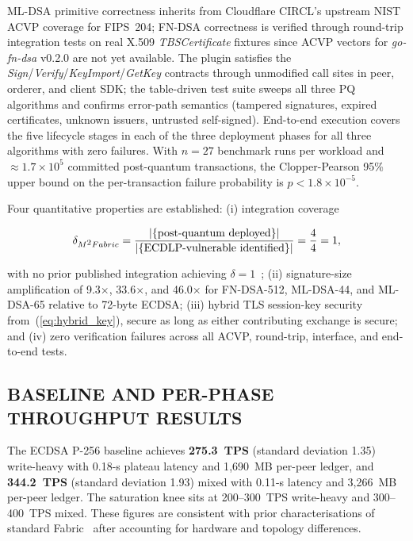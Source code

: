 \documentclass{ieeetj}
\makeatletter
\newcommand{\mfabric}{M\textsuperscript{2}Fabric}
\def\subsubsectionfont{\fontfamily{\sfdefault}\fontsize{9}{12}\selectfont\bfseries\raggedright}
\def\subsubsection{\@startsection{subsubsection}{3}{\z@}{-8pt \@plus -2pt \@minus -2pt}{1pt}{\subsubsectionfont}}
\makeatother
\begin{document}
ML-DSA primitive correctness inherits from Cloudflare CIRCL's upstream
NIST ACVP coverage for FIPS~204; FN-DSA correctness is verified through
round-trip integration tests on real X.509 \textit{TBSCertificate}
fixtures since ACVP vectors for \textit{go-fn-dsa} v0.2.0 are not yet
available. The plugin satisfies the
\textit{Sign}/\textit{Verify}/\textit{KeyImport}/\textit{GetKey} contracts
through unmodified call sites in peer, orderer, and client SDK; the
table-driven test suite sweeps all three PQ algorithms and confirms
error-path semantics (tampered signatures, expired certificates, unknown
issuers, untrusted self-signed). End-to-end execution covers the five
lifecycle stages in each of the three deployment phases for all three
algorithms with zero failures. With $n=27$ benchmark runs per workload
and $\approx 1.7\times 10^{5}$ committed post-quantum transactions, the
Clopper-Pearson 95\% upper bound on the per-transaction failure
probability is $p<1.8\times 10^{-5}$.

Four quantitative properties are established: (i) integration coverage

\begin{equation}
\delta_{\mfabric} =
\frac{|\{\text{post-quantum deployed}\}|}
{|\{\text{ECDLP-vulnerable identified}\}|}
= \frac{4}{4} = 1,
\label{eq:integration_coverage}
\end{equation}

with no prior published integration achieving
$\delta=1$~\cite{holcomb2021, hu2025prototype, abbas2025};
(ii) signature-size amplification of 9.3$\times$, 33.6$\times$, and
46.0$\times$ for FN-DSA-512, ML-DSA-44, and ML-DSA-65 relative to 72-byte
ECDSA; (iii) hybrid TLS session-key security
from~(\ref{eq:hybrid_key}), secure as long as either contributing
exchange is secure; and (iv) zero verification failures across all ACVP,
round-trip, interface, and end-to-end tests.

\subsection{BASELINE AND PER-PHASE THROUGHPUT RESULTS}
\label{sec:exp_results}

\subsubsection{ECDSA P-256 BASELINE}

The ECDSA P-256 baseline achieves \textbf{275.3~TPS} (standard deviation
1.35) write-heavy with 0.18-s plateau latency and 1{,}690~MB per-peer
ledger, and \textbf{344.2~TPS} (standard deviation 1.93) mixed with
0.11-s latency and 3{,}266~MB per-peer ledger. The saturation knee sits
at 200--300~TPS write-heavy and 300--400~TPS mixed. These figures are
consistent with prior characterisations of standard
Fabric~\cite{androulaki2018, baliga2018performance, kuzlu2021performance, nasir2018}
after accounting for hardware and topology differences.
\end{document}
